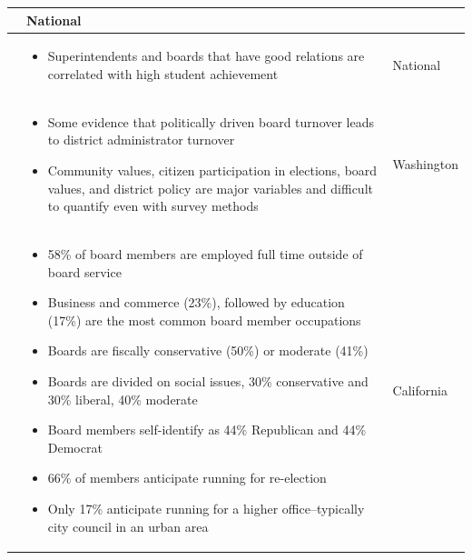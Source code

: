 \begin{small}
\begin{singlespace}
\begin{longtable}{| p{} | p{} | p{}|}
\begin{itemize}
\end{itemize} \vspace{-4mm}
& National \\ \hline
\citet{speer1998reaching} & \vspace{-6mm} \begin{itemize}
 \setlength\itemsep{-2pt}\item Superintendents and boards that have good relations are correlated with high student achievement \end{itemize} \vspace{-4mm} & National \\ \hline
\citet{RefWorks:311} & \vspace{-6mm} \begin{itemize} \setlength\itemsep{-2pt}\item Some evidence that politically driven board turnover leads to district administrator turnover \item Community values, citizen participation in elections, board values, and district policy are major variables and difficult to quantify even with survey methods
 \end{itemize} \vspace{-4mm}& Washington\\ \hline
\citet{RefWorks:333} &  \vspace{-6mm} \begin{itemize} \setlength\itemsep{-2pt}
\item 58\% of board members are employed full time outside of board service \item Business and commerce (23\%), followed by education (17\%) are the most common board member occupations \item Boards are fiscally conservative (50\%) or moderate (41\%) \item Boards are divided on social issues, 30\% conservative and 30\% liberal, 40\% moderate \item Board members self-identify as 44\% Republican and 44\% Democrat \item 66\% of members anticipate running for re-election \item Only 17\% anticipate running for a higher office--typically city council in an urban area 
\end{itemize} \vspace{-4mm} & California \\ \hline
\end{longtable}
\end{singlespace}
\end{small}


